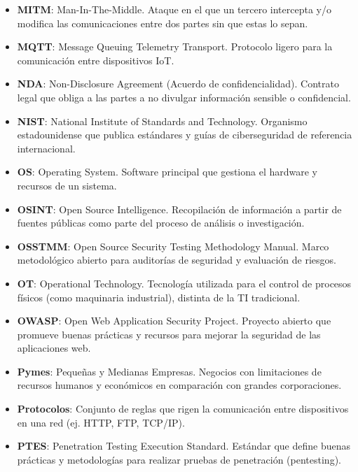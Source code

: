 \documentclass[a4paper, 11pt]{article}
\begin{document}
\begin{itemize}
    \item \textbf{MITM}: Man-In-The-Middle. Ataque en el que un tercero intercepta y/o modifica las comunicaciones entre dos partes sin que estas lo sepan.

    \item \textbf{MQTT}: Message Queuing Telemetry Transport. Protocolo ligero para la comunicación entre dispositivos IoT.

    \item \textbf{NDA}: Non-Disclosure Agreement (Acuerdo de confidencialidad). Contrato legal que obliga a las partes a no divulgar información sensible o confidencial.

    \item \textbf{NIST}: National Institute of Standards and Technology. Organismo estadounidense que publica estándares y guías de ciberseguridad de referencia internacional.

    \item \textbf{OS}: Operating System. Software principal que gestiona el hardware y recursos de un sistema.

    \item \textbf{OSINT}: Open Source Intelligence. Recopilación de información a partir de fuentes públicas como parte del proceso de análisis o investigación.

    \item \textbf{OSSTMM}: Open Source Security Testing Methodology Manual. Marco metodológico abierto para auditorías de seguridad y evaluación de riesgos.

    \item \textbf{OT}: Operational Technology. Tecnología utilizada para el control de procesos físicos (como maquinaria industrial), distinta de la TI tradicional.

    \item \textbf{OWASP}: Open Web Application Security Project. Proyecto abierto que promueve buenas prácticas y recursos para mejorar la seguridad de las aplicaciones web.

    \item \textbf{Pymes}: Pequeñas y Medianas Empresas. Negocios con limitaciones de recursos humanos y económicos en comparación con grandes corporaciones.

    \item \textbf{Protocolos}: Conjunto de reglas que rigen la comunicación entre dispositivos en una red (ej. HTTP, FTP, TCP/IP).

    \item \textbf{PTES}: Penetration Testing Execution Standard. Estándar que define buenas prácticas y metodologías para realizar pruebas de penetración (pentesting).


\end{itemize}
\end{document}
